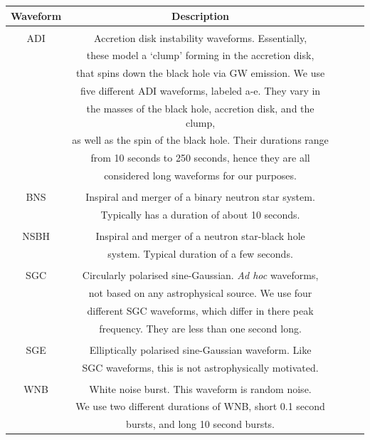 \documentclass[11pt]{cuthesis}
\begin{document}
\begin{table} \label{tab:wfs}
\centering
\begin{tabular}{| c | c | c | c | c |} 
 \hline
\textbf{Waveform }& \textbf{Description}  \\ [0.5ex] 
 \hline\hline
& \\ 
ADI & Accretion disk instability waveforms. Essentially, \\ & these model a `clump' forming in the accretion disk, \\ & that spins down the black hole via GW emission. We use \\ & five different ADI waveforms, labeled a-e. They vary in \\ & the masses of the black hole, accretion disk, and the clump,  \\ & as well as the spin of the black hole. Their durations range \\ & from 10 seconds to 250 seconds, hence they are all \\ & considered long waveforms for our purposes. \cite{vanputten2,vanputten1}  \\

\hline
& \\
BNS & Inspiral and merger of a binary neutron star system. \\ & Typically has a duration of about 10 seconds.  \\

\hline
& \\
NSBH & Inspiral and merger of a neutron star-black hole \\ & system. Typical duration of a few seconds. \\

\hline
& \\
SGC & Circularly polarised sine-Gaussian. \textit{Ad hoc} waveforms, \\ & not based on any astrophysical source. We use four \\ & different SGC waveforms, which differ in there peak \\ & frequency. They are less than one second long. \\

\hline
& \\
SGE  & Elliptically polarised sine-Gaussian waveform. Like \\ & SGC waveforms, this is not astrophysically motivated. \\

\hline
& \\
WNB & White noise burst. This waveform is random noise. \\ & We use two different durations of WNB, short 0.1 second \\ & bursts, and long 10 second bursts. \\


\end{tabular}
\end{table}
\end{document}
